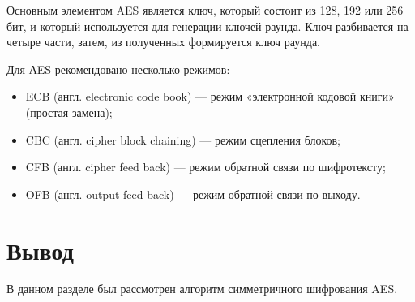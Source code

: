 Основным элементом AES является ключ, который состоит из 128, 192 или 256 бит, и который используется для генерации ключей раунда. Ключ разбивается на четыре части, затем, из полученных  формируется ключ раунда.

Для АES рекомендовано несколько режимов:

\begin{itemize}
	\item ECB (англ. electronic code book) --- режим «электронной кодовой книги» (простая замена);
	\item CBC (англ. cipher block chaining) --- режим сцепления блоков;
	\item CFB (англ. cipher feed back) --- режим обратной связи по шифротексту;
	\item OFB (англ. output feed back) --- режим обратной связи по выходу.
\end{itemize}

\section*{Вывод}
В данном разделе был рассмотрен алгоритм симметричного шифрования AES.